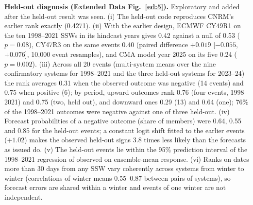 \documentclass[11pt]{article}
\begin{document}
\textbf{Held-out diagnosis (Extended Data Fig.~\ref{ed:5}).} Exploratory and added after the held-out result was seen. (i) The held-out code reproduces CNRM's earlier rank exactly (0.4271). (ii) With the earlier design, ECMWF CY49R1 on the ten 1998–2021 SSWs in its hindcast years gives 0.42 against a null of 0.53 ($p = 0.08$), CY47R3 on the same events 0.40 (paired difference $+0.019$ [$-0.055$, $+0.076$], 10,000 event resamples), and CMA model year 2025 on its five 0.24 ($p = 0.002$). (iii) Across all 20 events (multi-system means over the nine confirmatory systems for 1998–2021 and the three held-out systems for 2023–24) the rank averages 0.31 when the observed outcome was negative (14 events) and 0.75 when positive (6); by period, upward outcomes rank 0.76 (four events, 1998–2021) and 0.75 (two, held out), and downward ones 0.29 (13) and 0.64 (one); 76\% of the 1998–2021 outcomes were negative against one of three held-out. (iv) Forecast probabilities of a negative outcome (share of members) were 0.64, 0.55 and 0.85 for the held-out events; a constant logit shift fitted to the earlier events ($+1.02$) makes the observed held-out signs 3.8 times less likely than the forecasts as issued do. (v) The held-out events lie within the 95\% prediction interval of the 1998–2021 regression of observed on ensemble-mean response. (vi) Ranks on dates more than 30 days from any SSW vary coherently across systems from winter to winter (correlations of winter means 0.55–0.87 between pairs of systems), so forecast errors are shared within a winter and events of one winter are not independent.
\end{document}
